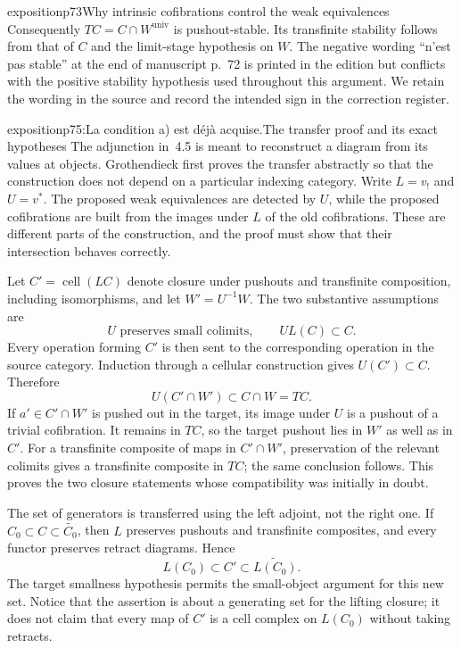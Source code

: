 \begin{dcomment}{exposition}{p73}{Why intrinsic cofibrations control the weak equivalences}
Consequently $TC=C\cap W^{\mathrm{univ}}$ is pushout-stable. Its transfinite stability follows from that of $C$ and the limit-stage hypothesis on $W$. The negative wording ``n'est pas stable'' at the end of manuscript p.~72 is printed in the edition but conflicts with the positive stability hypothesis used throughout this argument. We retain the wording in the source and record the intended sign in the correction register.
\end{dcomment}

\begin{dcomment}{exposition}{p75:La condition a) est déjà acquise.}{The transfer proof and its exact hypotheses}
The adjunction in~4.5 is meant to reconstruct a diagram from its values at objects. Grothendieck first proves the transfer abstractly so that the construction does not depend on a particular indexing category. Write $L=v_!$ and $U=v^*$. The proposed weak equivalences are detected by $U$, while the proposed cofibrations are built from the images under $L$ of the old cofibrations. These are different parts of the construction, and the proof must show that their intersection behaves correctly.

Let $C'=\operatorname{cell}(LC)$ denote closure under pushouts and transfinite composition, including isomorphisms, and let $W'=U^{-1}W$. The two substantive assumptions are
\[
 U\text{ preserves small colimits},\qquad UL(C)\subset C.
\]
Every operation forming $C'$ is then sent to the corresponding operation in the source category. Induction through a cellular construction gives $U(C')\subset C$. Therefore
\[
 U(C'\cap W')\subset C\cap W=TC.
\]
If $a'\in C'\cap W'$ is pushed out in the target, its image under $U$ is a pushout of a trivial cofibration. It remains in $TC$, so the target pushout lies in $W'$ as well as in $C'$. For a transfinite composite of maps in $C'\cap W'$, preservation of the relevant colimits gives a transfinite composite in $TC$; the same conclusion follows. This proves the two closure statements whose compatibility was initially in doubt.

The set of generators is transferred using the left adjoint, not the right one. If $C_0\subset C\subset\widetilde{C_0}$, then $L$ preserves pushouts and transfinite composites, and every functor preserves retract diagrams. Hence
\[
 L(C_0)\subset C'\subset\widetilde{L(C_0)}.
\]
The target smallness hypothesis permits the small-object argument for this new set. Notice that the assertion is about a generating set for the lifting closure; it does not claim that every map of $C'$ is a cell complex on $L(C_0)$ without taking retracts.


\end{dcomment}
